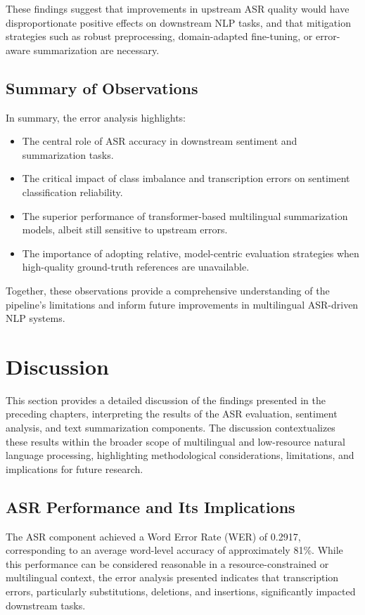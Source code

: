 These findings suggest that improvements in upstream ASR quality would have disproportionate positive effects on downstream NLP tasks, and that mitigation strategies such as robust preprocessing, domain-adapted fine-tuning, or error-aware summarization are necessary.

\subsection{Summary of Observations}

In summary, the error analysis highlights:

\begin{itemize}
    \item The central role of ASR accuracy in downstream sentiment and summarization tasks.
    \item The critical impact of class imbalance and transcription errors on sentiment classification reliability.
    \item The superior performance of transformer-based multilingual summarization models, albeit still sensitive to upstream errors.
    \item The importance of adopting relative, model-centric evaluation strategies when high-quality ground-truth references are unavailable.
\end{itemize}

Together, these observations provide a comprehensive understanding of the pipeline’s limitations and inform future improvements in multilingual ASR-driven NLP systems.

\section{Discussion}
This section provides a detailed discussion of the findings presented in the preceding chapters, interpreting the results of the ASR evaluation, sentiment analysis, and text summarization components. The discussion contextualizes these results within the broader scope of multilingual and low-resource natural language processing, highlighting methodological considerations, limitations, and implications for future research.

\subsection{ASR Performance and Its Implications}

The ASR component achieved a Word Error Rate (WER) of 0.2917, corresponding to an average word-level accuracy of approximately 81\%. While this performance can be considered reasonable in a resource-constrained or multilingual context, the error analysis presented indicates that transcription errors, particularly substitutions, deletions, and insertions, significantly impacted downstream tasks.


